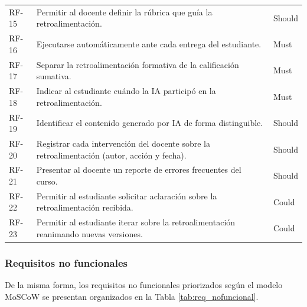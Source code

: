 \documentclass[letterpaper, 10 pt, conference]{ieeeconf}
\begin{document}
\begin{table}[ht]
\begin{tabular}{lp{5.0cm}l}
		RF-15 & Permitir al docente definir la rúbrica que guía la retroalimentación. & Should \\
		RF-16 & Ejecutarse automáticamente ante cada entrega del estudiante. & Must \\
		RF-17 & Separar la retroalimentación formativa de la calificación sumativa. & Must \\
		RF-18 & Indicar al estudiante cuándo la IA participó en la retroalimentación. & Must \\
		RF-19 & Identificar el contenido generado por IA de forma distinguible. & Should \\
		RF-20 & Registrar cada intervención del docente sobre la retroalimentación (autor, acción y fecha). & Should \\
		RF-21 & Presentar al docente un reporte de errores frecuentes del curso. & Should \\
		RF-22 & Permitir al estudiante solicitar aclaración sobre la retroalimentación recibida. & Could \\
		RF-23 & Permitir al estudiante iterar sobre la retroalimentación reanimando nuevas versiones. & Could \\
		\hline
	\end{tabular}
\end{table}

\subsubsection{Requisitos no funcionales}
De la misma forma, los requisitos no funcionales priorizados según el modelo MoSCoW se presentan organizados en la Tabla \ref{tab:req_nofuncional}.
\end{document}
